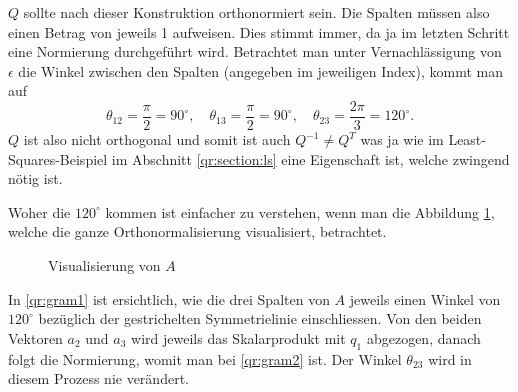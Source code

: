 $Q$ sollte nach dieser Konstruktion orthonormiert sein.
Die Spalten müssen also einen Betrag von jeweils 1 aufweisen. 
Dies stimmt immer, da ja im letzten Schritt eine Normierung durchgeführt wird.
Betrachtet man unter Vernachlässigung von $\epsilon$ die Winkel zwischen den Spalten (angegeben im jeweiligen Index), kommt man auf
\begin{equation*}
\theta_{12}=\frac{\pi}{2}=90^\circ,\quad \theta_{13}=\frac{\pi}{2}=90^\circ, \quad \theta_{23}=\frac{2\pi}{3}=120^\circ.
\end{equation*}
$Q$ ist also nicht orthogonal und somit ist auch $Q^{-1}\ne Q^T$ was ja wie im Least-Squares-Beispiel im Abschnitt \ref{qr:section:ls} eine Eigenschaft ist, welche zwingend nötig ist.

Woher die $120^\circ$ kommen ist einfacher zu verstehen, wenn man die Abbildung \ref{qr:gram}, welche die ganze Orthonormalisierung visualisiert, betrachtet.
\begin{figure}[ht]
	\centering
	\caption{Visualisierung von $A$\label{qr:gram}}
\end{figure}
In \ref{qr:gram1} ist ersichtlich, wie die drei Spalten von $A$ jeweils einen Winkel von $120^\circ$ bezüglich der gestrichelten Symmetrielinie einschliessen.
Von den beiden Vektoren $a_2$ und $a_3$ wird jeweils das Skalarprodukt mit $q_1$ abgezogen, danach folgt die Normierung, womit man bei \ref{qr:gram2} ist.
Der Winkel $\theta_{23}$ wird in diesem Prozess nie verändert.